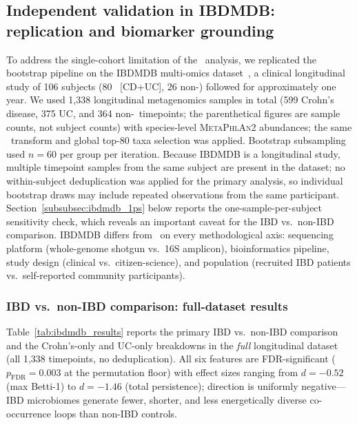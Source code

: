 \subsection{Independent validation in IBDMDB: replication and biomarker grounding}
\label{subsec:ibdmdb}

To address the single-cohort limitation of the \agp\ analysis, we replicated
the bootstrap pipeline on the IBDMDB multi-omics dataset~\citep{lloydprice2019multi},
a clinical longitudinal study of 106 subjects (80 \ibd\ [CD+UC], 26 non-\ibd)
followed for approximately one year.
We used 1{,}338 longitudinal metagenomics samples in total
(599 Crohn's disease, 375 UC, and 364 non-\ibd\ timepoints;
the parenthetical figures are sample counts, not subject counts)
with species-level \textsc{MetaPhlAn}2 abundances; the same \clr\ transform
and global top-80 taxa selection was applied.
Bootstrap subsampling used $n = 60$ per group per iteration.
Because IBDMDB is a longitudinal study, multiple timepoint samples from the
same subject are present in the dataset; no within-subject deduplication was
applied for the primary analysis, so individual bootstrap draws may include
repeated observations from the same participant.
Section~\ref{subsubsec:ibdmdb_1ps} below reports the one-sample-per-subject
sensitivity check, which reveals an important caveat for the IBD vs.\ non-IBD
comparison.
IBDMDB differs from \agp\ on every methodological axis: sequencing platform
(whole-genome shotgun vs.\ 16S amplicon), bioinformatics pipeline, study
design (clinical vs.\ citizen-science), and population (recruited IBD patients
vs.\ self-reported community participants).

\subsubsection*{IBD vs.\ non-IBD comparison: full-dataset results}
\label{subsubsec:ibdmdb_full}

Table~\ref{tab:ibdmdb_results} reports the primary IBD vs.\ non-IBD comparison
and the Crohn's-only and UC-only breakdowns in the \emph{full} longitudinal
dataset (all 1,338 timepoints, no deduplication).
All six features are FDR-significant ($p_\text{FDR} = 0.003$ at the
permutation floor) with effect sizes ranging from $d = -0.52$ (max Betti-1) to
$d = -1.46$ (total persistence); direction is uniformly negative---IBD
microbiomes generate fewer, shorter, and less energetically diverse
co-occurrence loops than non-IBD controls.

